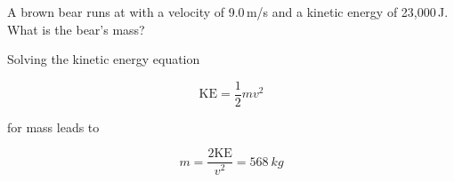 \documentclass[../main-physics-problems.tex]{subfiles}
\begin{document}
\begin{questions}







\question %
A brown bear runs at with a velocity of 9.0\,m/s and a kinetic energy of 23,000\,J. What is the bear’s mass?

\begin{solution}
Solving the kinetic energy equation

\begin{equation*}
    \mathrm{KE} = \frac{1}{2} mv^2
\end{equation*}

for mass leads to

\begin{equation*}
    m = \frac{2\mathrm{KE}}{v^2} = \boxed{\SI{568}{kg}}
\end{equation*}
\end{solution}







\end{questions}
\end{document}
